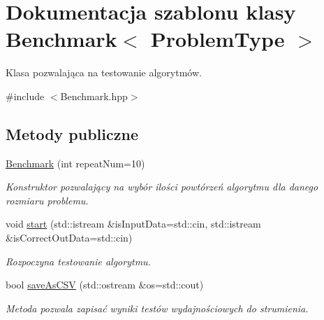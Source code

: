 \hypertarget{class_benchmark}{\section{Dokumentacja szablonu klasy Benchmark$<$ Problem\-Type $>$}
\label{class_benchmark}
}


Klasa pozwalająca na testowanie algorytmów.  




{\ttfamily \#include $<$Benchmark.\-hpp$>$}

\subsection*{Metody publiczne}
\begin{DoxyCompactItemize}
\item 
\hyperlink{class_benchmark_a31b07bc67080bad70e0695840f38d304}{Benchmark} (int repeat\-Num=10)
\begin{DoxyCompactList}\small\item\em Konstruktor pozwalający na wybór ilości powtórzeń algorytmu dla danego rozmiaru problemu. \end{DoxyCompactList}\item 
void \hyperlink{class_benchmark_aed80ebc889c52da37b8627c707651b8e}{start} (std\-::istream \&is\-Input\-Data=std\-::cin, std\-::istream \&is\-Correct\-Out\-Data=std\-::cin)
\begin{DoxyCompactList}\small\item\em Rozpoczyna testowanie algorytmu. \end{DoxyCompactList}\item 
bool \hyperlink{class_benchmark_ae418c8bf313d8af29903414ab85d5482}{save\-As\-C\-S\-V} (std\-::ostream \&os=std\-::cout)
\begin{DoxyCompactList}\small\item\em Metoda pozwala zapisać wyniki testów wydajnościowych do strumienia. \end{DoxyCompactList}\end{DoxyCompactItemize}
